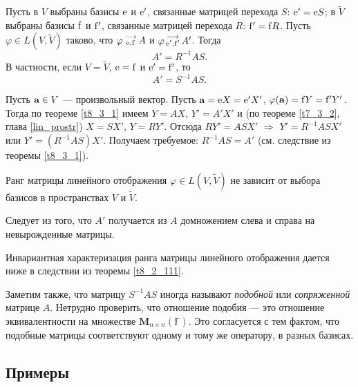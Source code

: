 \begin{theor}\label{t8_3_2}
Пусть в $V$ выбраны базисы $\mathrm{e}$ и $\mathrm{e}'$, связанные матрицей перехода $S$:
$\mathrm{e}'= \mathrm{e} S$;
в $\widetilde{V}$ выбраны базисы $\mathrm{f}$ и $\mathrm{f}'$, связанные матрицей перехода $R$:
$\mathrm{f}'= \mathrm{f} R$.
Пусть $\varphi \in L(V, \widetilde{V})$ таково, что 
$\varphi \begin{smallmatrix} \longrightarrow \\ \mathrm{e}, \mathrm{f} \end{smallmatrix} A$ и $\varphi \begin{smallmatrix} \longrightarrow \\ \mathrm{e'}, \mathrm{f'} \end{smallmatrix} A'$.
Тогда  $$\boxed{A' = R^{-1}AS}.$$
В частности, если $V=\widetilde{V}$, $\mathrm{e}= \mathrm{f}$ и $\mathrm{e}'= \mathrm{f}' $, то 
$$\boxed{A' = S^{-1}AS}.$$
\end{theor}
\dok Пусть $\mathbf{a}\in V$ --- произвольный вектор. Пусть $\mathbf{a}=\mathrm{e}X = \mathrm{e}'X'$, 
$\varphi(\mathbf{a})=\mathrm{f}Y = \mathrm{f}'Y'$. Тогда по теореме \ref{t8_3_1}  имеем $Y=AX$, $Y'=A'X'$ и
(по теореме \ref{t7_3_2}, глава \ref{lin_prostr}) $X=SX'$, $Y=RY'$. 
Отсюда $RY' = ASX'$ $\Rightarrow$ $Y' = R^{-1}ASX'$ или $Y' = (R^{-1}AS)X'$.
Получаем требуемое: $R^{-1}AS=A'$ (см. следствие из теоремы \ref{t8_3_1}).
\edok

\begin{sled}
Ранг матрицы линейного отображения $\varphi \in L(V, \widetilde{V})$ не зависит от выбора базисов в пространствах $V$ и $\widetilde{V}$.
\end{sled}
\dok
Следует из того, что $A'$ получается из $A$ домножением слева и справа на невырожденные матрицы.
\edok

\otstup

Инвариантная характеризация ранга матрицы линейного отображения дается ниже в следствии из теоремы \ref{t8_2_111}.

\otstup

Заметим также, что матрицу $S^{-1}AS$ иногда называют {\it подобной} или {\it сопряженной} матрице $A$.
Нетрудно проверить, что отношение подобия --- это отношение эквивалентности на множестве
$\mathbf{M}_{n\times n}(\mathbb{F})$. Это согласуется с тем фактом, что подобные матрицы соответствуют
одному и тому же оператору, в разных базисах.


\subsection{Примеры}

